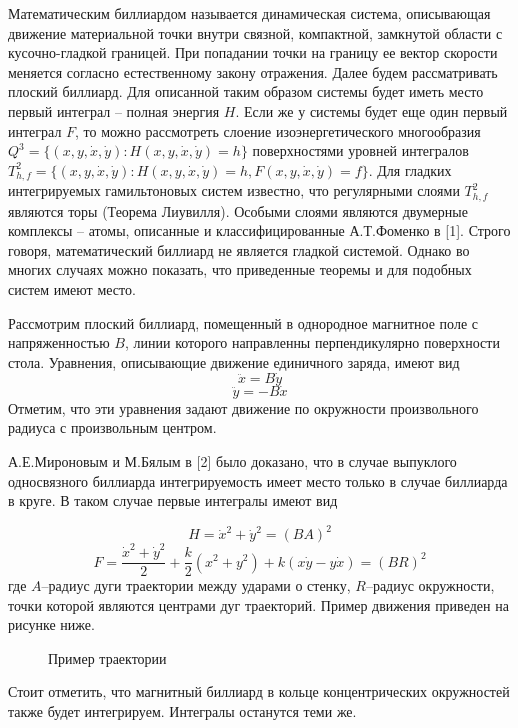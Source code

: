 \vzmscaption
	
	Математическим биллиардом называется динамическая система, описывающая движение материальной точки внутри связной, компактной, замкнутой области с кусочно-гладкой границей. При попадании точки на границу ее вектор скорости меняется согласно естественному закону отражения. Далее будем рассматривать плоский биллиард. Для описанной таким образом системы будет иметь место первый интеграл -- полная энергия $H$. Если же у системы будет еще один первый интеграл $F$, то можно рассмотреть слоение изоэнергетического многообразия $Q^3=\{(x,y,\dot{x}, \dot{y}): H(x,y,\dot{x}, \dot{y})=h\}$ поверхностями уровней интегралов $T^2_{h,f}=\{(x,y,\dot{x}, \dot{y}): H(x,y,\dot{x}, \dot{y})=h, F(x,y,\dot{x}, \dot{y})=f\}$. Для гладких интегрируемых гамильтоновых систем известно, что регулярными слоями $T^2_{h,f}$ являются торы (Теорема Лиувилля). Особыми слоями являются двумерные комплексы -- атомы, описанные и классифицированные А.Т.Фоменко в [1]. Строго говоря, математический биллиард не является гладкой системой. Однако во многих случаях можно показать, что приведенные теоремы и для подобных систем имеют место.
	
	Рассмотрим плоский биллиард, помещенный в однородное магнитное поле с напряженностью $B$, линии которого направленны перпендикулярно поверхности стола. Уравнения, описывающие движение единичного заряда, имеют вид
	$$
	\ddot{x} =B\dot{y}
	$$
	$$
	\ddot{y} =-B\dot{x}
	$$	
	Отметим, что эти уравнения задают движение по окружности произвольного радиуса с произвольным центром.
	
	А.Е.Мироновым и М.Бялым в [2] было доказано, что в случае выпуклого односвязного биллиарда интегрируемость имеет место только в случае биллиарда в круге. В таком случае первые интегралы имеют вид
	 
	$$
	H=\dot{x}^2+\dot{y}^2=(BA)^2
	$$
	$$
	F=\frac{\dot{x}^2+\dot{y}^2}{2}+\frac{k}{2}(x^2+y^2)+k(x\dot{y}-y\dot{x})=(BR)^2
	$$
	где $A$--радиус дуги траектории между ударами о стенку, $R$--радиус окружности, точки которой являются центрами дуг траекторий. Пример движения приведен на рисунке ниже.
	
	\begin{figure}[h!]
		\center{\texttt{[image: ex2]}}
		\caption{Пример траектории}
	\end{figure}
	Стоит отметить, что магнитный биллиард в кольце концентрических окружностей также будет интегрируем. Интегралы останутся теми же.
	
